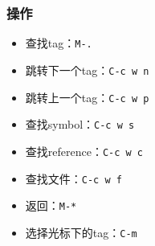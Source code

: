 \subsubsection{操作}
\begin{itemize}
\item 查找tag：\verb|M-.|
\item 跳转下一个tag：\verb|C-c w n|
\item 跳转上一个tag：\verb|C-c w p|
\item 查找symbol：\verb|C-c w s|
\item 查找reference：\verb|C-c w c|
\item 查找文件：\verb|C-c w f|
\item 返回：\verb|M-*|
\item 选择光标下的tag：\verb|C-m|
\end{itemize}


